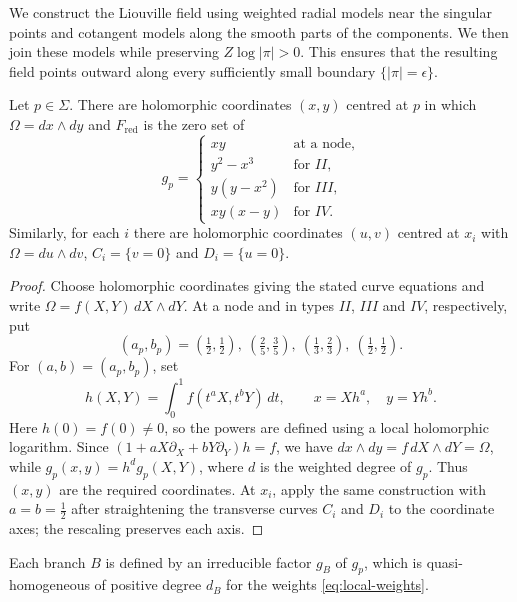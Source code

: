 \documentclass[a4paper]{amsart}
\numberwithin{equation}{section}
\begin{document}
We construct the Liouville field using weighted radial models near the
singular points and cotangent models along the smooth parts of the
components. We then join these models while preserving
$Z\log|\pi|>0$. This ensures that the resulting field points outward
along every sufficiently small boundary $\{|\pi|=\epsilon\}$.

\begin{lemma}\label{lem:local-normal-forms}
Let $p\in\Sigma$. There are holomorphic coordinates $(x,y)$ centred at
$p$ in which $\Omega=dx\wedge dy$ and $F_{\mathrm{red}}$ is the zero set
of
\[
 g_p=
 \begin{cases}
 xy&\text{at a node},\\
 y^2-x^3&\text{for }II,\\
 y(y-x^2)&\text{for }III,\\
 xy(x-y)&\text{for }IV.
 \end{cases}
\]
Similarly, for each $i$ there are holomorphic coordinates $(u,v)$
centred at $x_i$ with $\Omega=du\wedge dv$, $C_i=\{v=0\}$ and
$D_i=\{u=0\}$.
\end{lemma}

\begin{proof}
Choose holomorphic coordinates giving the stated curve equations and
write $\Omega=f(X,Y)\,dX\wedge dY$. At a node and in types $II$,
$III$ and $IV$, respectively, put
\begin{equation}\label{eq:local-weights}
 (a_p,b_p)=(\tfrac12,\tfrac12),\ (\tfrac25,\tfrac35),\
 (\tfrac13,\tfrac23),\ (\tfrac12,\tfrac12).
\end{equation}
For $(a,b)=(a_p,b_p)$, set
\[
 h(X,Y)=\int_0^1 f(t^a X,t^b Y)\,dt,\qquad
 x=Xh^a,\quad y=Yh^b.
\]
Here $h(0)=f(0)\ne0$, so the powers are defined using a local
holomorphic logarithm. Since $(1+aX\partial_X+bY\partial_Y)h=f$, we have
$dx\wedge dy=f\,dX\wedge dY=\Omega$, while
$g_p(x,y)=h^d g_p(X,Y)$, where $d$ is the weighted degree of $g_p$.
Thus $(x,y)$ are the required coordinates. At $x_i$, apply the same
construction with $a=b=\tfrac12$ after straightening the transverse
curves $C_i$ and $D_i$ to the coordinate axes; the rescaling preserves
each axis.
\end{proof}

Each branch $B$ is defined by an irreducible factor $g_B$ of $g_p$,
which is quasi-homogeneous of positive degree $d_B$ for the weights
\eqref{eq:local-weights}.
\end{document}
